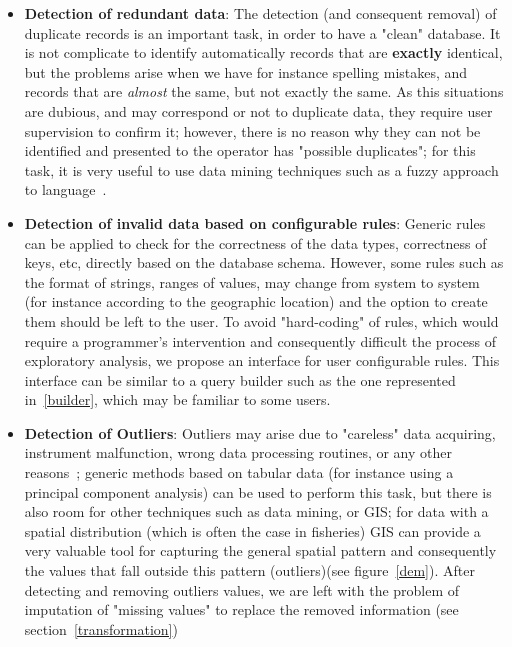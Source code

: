 \documentclass[11pt]{article} %
\begin{document}
\begin{itemize}
  \item \textbf{Detection of redundant data}: The detection (and consequent removal) of duplicate records is an important task, in order to have a "clean" database. It is not complicate to identify automatically records that are \textbf{exactly} identical, but the problems arise when we have for instance spelling mistakes, and records that are \textit{almost} the same, but not exactly the same. As this situations are dubious, and may correspond or not to duplicate data, they require user supervision to confirm it; however, there is no reason why they can not be identified and presented to the operator has "possible duplicates"; for this task, it is very useful to use data mining techniques such as a fuzzy approach to language~\cite{fuzzy}.

  \item \textbf{Detection of invalid data based on configurable rules}: Generic rules can be applied to check for the correctness of the data types, correctness of keys, etc, directly based on the database schema. However, some rules such as the format of strings, ranges of values, may change from system to system  (for instance according to the geographic location) and the option to create them should be left to the user. To avoid "hard-coding" of rules, which would require a programmer's intervention and consequently difficult the process of exploratory analysis, we propose an interface for user configurable rules. This interface can be similar to a query builder such as the one represented in~\ref{builder}, which may be familiar to some users.

  \item \textbf{Detection of Outliers}: Outliers may arise due to "careless" data acquiring, instrument malfunction, wrong data processing routines, or any other reasons~\cite{outliers}; generic methods based on tabular data (for instance using a principal component analysis) can be used to perform this task, but there is also room for other techniques such as data mining, or GIS; for data with a spatial distribution (which is often the case in fisheries) GIS can provide a very valuable tool for capturing the general spatial pattern and consequently the values that fall outside this pattern (outliers)(see figure~\ref{dem}).
  After detecting and removing outliers values, we are left with the problem of imputation of "missing values" to replace the removed information (see section~\ref{transformation})

\end{itemize}
\end{document}
